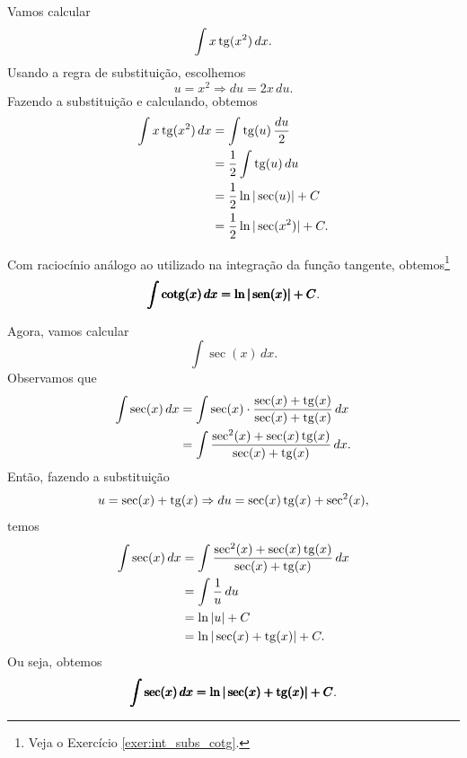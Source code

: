 \begin{ex}
  Vamos calcular
  \begin{equation}
    \int x\operatorname{tg}(x^2)\,dx.
  \end{equation}
  Usando a regra de substituição, escolhemos
  \begin{equation}
    u = x^2 \Rightarrow du = 2x\,du.
  \end{equation}
  Fazendo a substituição e calculando, obtemos
  \begin{align}
    \int x\operatorname{tg}(x^2)\,dx &= \int \operatorname{tg}(u)\,\frac{du}{2} \\
                       &= \frac{1}{2}\int \operatorname{tg}(u)\,du \\
                       &= \frac{1}{2}\ln|\sec(u)| + C \\
                       &= \frac{1}{2}\ln|\sec(x^2)| + C.
  \end{align}
\end{ex}

Com raciocínio análogo ao utilizado na integração da função tangente, obtemos\footnote{Veja o Exercício \ref{exer:int_subs_cotg}.}
\begin{equation}
  \pmb{\int \operatorname{cotg}(x)\,dx = \ln|\operatorname{sen}(x)| + C}.
\end{equation}

Agora, vamos calcular
\begin{equation}
  \int \sec(x)\,dx.
\end{equation}
Observamos que
\begin{align}
  \int\sec(x)\,dx &= \int \sec(x)\cdot\frac{\sec(x)+\operatorname{tg}(x)}{\sec(x)+\operatorname{tg}(x)}\,dx \\
                  &= \int \frac{\sec^2(x)+\sec(x)\operatorname{tg}(x)}{\sec(x)+\operatorname{tg}(x)}\,dx.
\end{align}
Então, fazendo a substituição
\begin{equation}
  u = \sec(x) + \operatorname{tg}(x) \Rightarrow du = \sec(x)\operatorname{tg}(x) + \sec^2(x),
\end{equation}
temos
\begin{align}
  \int\sec(x)\,dx &= \int\frac{\sec^2(x)+\sec(x)\operatorname{tg}(x)}{\sec(x)+\operatorname{tg}(x)}\,dx \\
                  &= \int\frac{1}{u}\,du \\
                  &= \ln|u| + C \\
                  &= \ln|\sec(x)+\operatorname{tg}(x)| + C.
\end{align}
Ou seja, obtemos
\begin{equation}
  \pmb{\int\sec(x)\,dx = \ln|\sec(x)+\operatorname{tg}(x)|+C}.
\end{equation}

